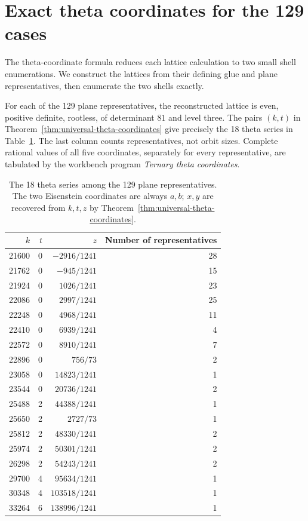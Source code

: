\section{Exact theta coordinates for the 129 cases}
The theta-coordinate formula reduces each lattice calculation to two
small shell enumerations. We construct the lattices from their defining
glue and plane representatives, then enumerate the two shells exactly.

\begin{theorem}
\label{thm:129-theta}
For each of the 129 plane representatives, the reconstructed lattice
is even, positive definite, rootless, of determinant $81$ and level
three. The pairs $(k,t)$ in
Theorem~\ref{thm:universal-theta-coordinates} give precisely the
18 theta series in Table~\ref{tab:18theta}. The last column counts
representatives, not orbit sizes. Complete rational values of all five
coordinates, separately for every representative, are tabulated by
the workbench program \emph{Ternary theta coordinates}.
\end{theorem}

\begin{table}[htbp]
\centering\small
\caption{The 18 theta series among the 129 plane representatives.
The two Eisenstein coordinates are always $a,b$; $x,y$ are recovered
from $k,t,z$ by Theorem~\ref{thm:universal-theta-coordinates}.}
\label{tab:18theta}
\begin{tabular}{rrrr}
\hline
$k$&$t$&$z$&Number of representatives\\\hline
21600&0&$-2916/1241$&28\\
21762&0&$-945/1241$&15\\
21924&0&$1026/1241$&23\\
22086&0&$2997/1241$&25\\
22248&0&$4968/1241$&11\\
22410&0&$6939/1241$&4\\
22572&0&$8910/1241$&7\\
22896&0&$756/73$&2\\
23058&0&$14823/1241$&1\\
23544&0&$20736/1241$&2\\
25488&2&$44388/1241$&1\\
25650&2&$2727/73$&1\\
25812&2&$48330/1241$&2\\
25974&2&$50301/1241$&2\\
26298&2&$54243/1241$&2\\
29700&4&$95634/1241$&1\\
30348&4&$103518/1241$&1\\
33264&6&$138996/1241$&1\\\hline
\end{tabular}
\end{table}

